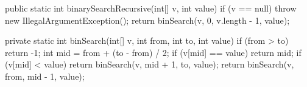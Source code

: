 \begin{unipdcode}[language=Java]
public static int binarySearchRecursive(int[] v, int value) {
    if (v == null) throw new IllegalArgumentException();
    return binSearch(v, 0, v.length - 1, value);
}

private static int binSearch(int[] v, int from, int to, int value) {
    if (from > to) return -1;
    int mid = from + (to - from) / 2;
    if (v[mid] == value) return mid;
    if (v[mid] < value)
        return binSearch(v, mid + 1, to, value);
    return binSearch(v, from, mid - 1, value);
}
\end{unipdcode}
